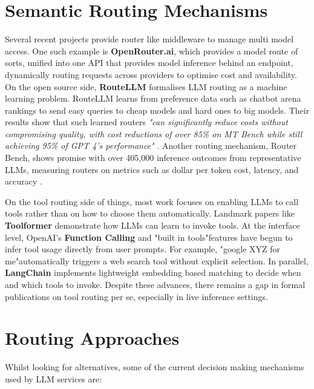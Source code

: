 \section{Semantic Routing Mechanisms}

Several recent projects provide router like middleware to manage multi model access. One such example is \textbf{OpenRouter.ai}, which provides a model route of sorts, unified into one API that provides model inference behind an endpoint, dynamically routing requests across providers to optimise cost and availability. On the open source side, \textbf{RouteLLM} formalises LLM routing as a machine learning problem. RouteLLM learns from preference data such as chatbot arena rankings to send easy queries to cheap models and hard ones to big models. Their results show that such learned routers \textit{"can significantly reduce costs without compromising quality, with cost reductions of over 85\% on MT Bench while still achieving 95\% of GPT 4's performance"} \cite{lmsysroutellm}. Another routing mechanism, Router Bench, shows promise with over 405,000 inference outcomes from representative LLMs, measuring routers on metrics such as dollar per token cost, latency, and accuracy \cite{hu2024routerbenchbenchmarkmultillmrouting}.

On the tool routing side of things, most work focuses on enabling LLMs to call tools rather than on how to choose them automatically. Landmark papers like \textbf{Toolformer} \cite{schick2023toolformerlanguagemodelsteach} demonstrate how LLMs can learn to invoke tools. At the interface level, OpenAI's \textbf{Function Calling} and "built in tools"features have begun to infer tool usage directly from user prompts. For example, "google XYZ for me"automatically triggers a web search tool without explicit selection. In parallel, \textbf{LangChain} implements lightweight embedding based matching to decide when and which tools to invoke. Despite these advances, there remains a gap in formal publications on tool routing per se, especially in live inference settings.

\section{Routing Approaches}

Whilst looking for alternatives, some of the current decision making mechanisms used by LLM services are:

